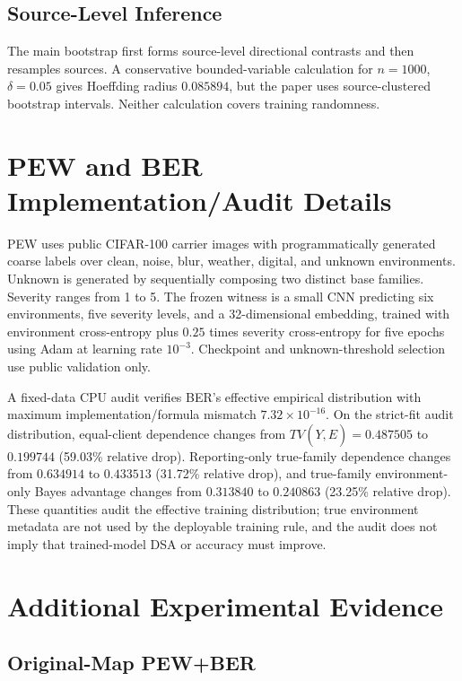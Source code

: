 \subsection{Source-Level Inference}

The main bootstrap first forms source-level directional contrasts and then resamples sources. A conservative bounded-variable calculation for \(n=1000\), \(\delta=0.05\) gives Hoeffding radius \(0.085894\), but the paper uses source-clustered bootstrap intervals. Neither calculation covers training randomness.

\section{PEW and BER Implementation/Audit Details}

PEW uses public CIFAR-100 carrier images with programmatically generated coarse labels over clean, noise, blur, weather, digital, and unknown environments. Unknown is generated by sequentially composing two distinct base families. Severity ranges from 1 to 5. The frozen witness is a small CNN predicting six environments, five severity levels, and a 32-dimensional embedding, trained with environment cross-entropy plus \(0.25\) times severity cross-entropy for five epochs using Adam at learning rate \(10^{-3}\). Checkpoint and unknown-threshold selection use public validation only.

A fixed-data CPU audit verifies BER's effective empirical distribution with maximum implementation/formula mismatch \(7.32\times10^{-16}\). On the strict-fit audit distribution, equal-client dependence changes from \(TV(Y,\hat E)=0.487505\) to \(0.199744\) (59.03\% relative drop). Reporting-only true-family dependence changes from \(0.634914\) to \(0.433513\) (31.72\% relative drop), and true-family environment-only Bayes advantage changes from \(0.313840\) to \(0.240863\) (23.25\% relative drop). These quantities audit the effective training distribution; true environment metadata are not used by the deployable training rule, and the audit does not imply that trained-model DSA or accuracy must improve.

\section{Additional Experimental Evidence}

\subsection{Original-Map PEW+BER}

